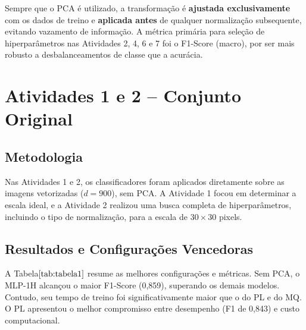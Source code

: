 \documentclass[11pt,a4paper]{article}
\begin{document}
Sempre que o PCA é utilizado, a transformação é \textbf{ajustada exclusivamente} com os dados de treino e \textbf{aplicada antes} de qualquer normalização subsequente, evitando vazamento de informação. A métrica primária para seleção de hiperparâmetros nas Atividades 2, 4, 6 e 7 foi o F1-Score (macro), por ser mais robusto a desbalanceamentos de classe que a acurácia.

\section{Atividades 1 e 2 – Conjunto Original}

\subsection{Metodologia}
Nas Atividades 1 e 2, os classificadores foram aplicados diretamente sobre as imagens vetorizadas (\(d=900\)), sem PCA. A Atividade 1 focou em determinar a escala ideal, e a Atividade 2 realizou uma busca completa de hiperparâmetros, incluindo o tipo de normalização, para a escala de \(30 \times 30\) pixels.

\subsection{Resultados e Configurações Vencedoras}
A Tabela\(\ref{tab:tabela1}\) resume as melhores configurações e métricas. Sem PCA, o MLP-1H alcançou o maior F1-Score (0,859), superando os demais modelos. Contudo, seu tempo de treino foi significativamente maior que o do PL e do MQ. O PL apresentou o melhor compromisso entre desempenho (F1 de 0,843) e custo computacional.

\begin{table}[h!]
  \centering
  \caption{Resultados médios das Atividades 1–2 (sem PCA, escala \(30 \times 30\)).}
  \label{tab:tabela1}
\end{table}
\end{document}

